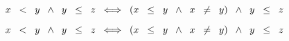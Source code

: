 \documentclass[12pt]{article}
\begin{document}
\begin{center}
    $\hspace{2cm} x\hspace{0.2cm}<\hspace{0.2cm}y\hspace{0.2cm} \wedge\hspace{0.2cm} y\hspace{0.2cm}\leq\hspace{0.2cm} z\hspace{0.2cm}\Longleftrightarrow\hspace{0.2cm} (x\hspace{0.2cm}\leq\hspace{0.2cm}y\hspace{0.2cm} \wedge\hspace{0.2cm} x\hspace{0.2cm}\neq\hspace{0.2cm}y)\hspace{0.2cm}\wedge\hspace{0.2cm} y \hspace{0.2cm} \leq \hspace{0.2cm} z$ 
\end{center}
\newpage
\begin{center}
    $\hspace{2cm} x\hspace{0.2cm}<\hspace{0.2cm}y\hspace{0.2cm} \wedge\hspace{0.2cm} y\hspace{0.2cm}\leq\hspace{0.2cm} z\hspace{0.2cm}\Longleftrightarrow\hspace{0.2cm} (x\hspace{0.2cm}\leq\hspace{0.2cm}y\hspace{0.2cm} \wedge\hspace{0.2cm} x\hspace{0.2cm}\neq\hspace{0.2cm}y)\hspace{0.2cm}\wedge\hspace{0.2cm} y \hspace{0.2cm} \leq \hspace{0.2cm} z$ 
\end{center}\vspace{0.2cm}
\end{document}
